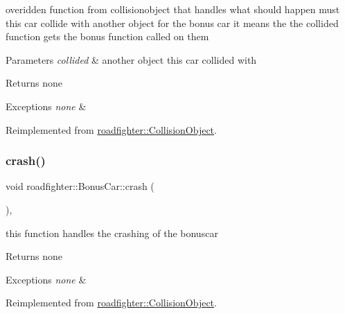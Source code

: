 overidden function from collisionobject that handles what should happen must this car collide with another object for the bonus car it means the the collided function gets the bonus function called on them 
\begin{DoxyParams}{Parameters}
{\em collided} & another object this car collided with \\
\hline
\end{DoxyParams}
\begin{DoxyReturn}{Returns}
none 
\end{DoxyReturn}

\begin{DoxyExceptions}{Exceptions}
{\em none} & \\
\hline
\end{DoxyExceptions}


Reimplemented from \hyperlink{classroadfighter_1_1CollisionObject_a9eba85551432f548f2a0c20217a60f42}{roadfighter\+::\+Collision\+Object}.

\mbox{\label{classroadfighter_1_1BonusCar_aad0a2a41a1b84c6487c1fc204b5f7cb7}} 
\subsubsection{\texorpdfstring{crash()}{crash()}}
{\footnotesize\ttfamily void roadfighter\+::\+Bonus\+Car\+::crash (\begin{DoxyParamCaption}{ }\end{DoxyParamCaption})\hspace{0.3cm}{\ttfamily [override]}, {\ttfamily [virtual]}}

this function handles the crashing of the bonuscar \begin{DoxyReturn}{Returns}
none 
\end{DoxyReturn}

\begin{DoxyExceptions}{Exceptions}
{\em none} & \\
\hline
\end{DoxyExceptions}


Reimplemented from \hyperlink{classroadfighter_1_1CollisionObject_a9a5265d810f0ed7583b60046ab3fa88c}{roadfighter\+::\+Collision\+Object}.

\mbox{\label{classroadfighter_1_1BonusCar_a19d01e92134634a82ae53f0d017956aa}} 
